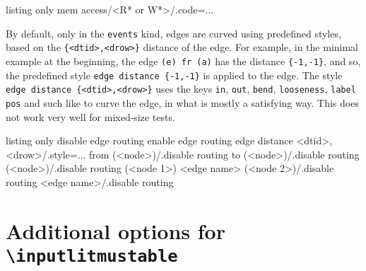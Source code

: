 \documentclass[a4paper]{article}
\begin{document}
\begin{tcblisting}{listing only}
mem access/<R* or W*>/.code={...} %
\end{tcblisting}

By default, only in the \lstinline|events| kind, edges are curved using predefined
styles, based on the \lstinline|{<dtid>,<drow>}| distance of the edge.
For example, in the minimal example at the beginning, the edge
\lstinline|(e) fr (a)| has the distance \lstinline|{-1,-1}|, and so, the predefined
style \lstinline|edge distance {-1,-1}| is applied to the edge.
The style \lstinline|edge distance {<dtid>,<drow>}| uses the keys \lstinline|in|,
\lstinline|out|, \lstinline|bend|, \lstinline|looseness|, \lstinline|label pos| and such like
to curve the edge, in what is mostly a satisfying way.
This does not work very well for mixed-size tests.

\begin{tcblisting}{listing only}
disable edge routing
enable edge routing
edge distance {<dtid>,<drow>}/.style={...}
from (<node>)/.disable routing                     %
to (<node>)/.disable routing                       %
(<node>)/.disable routing                          %
(<node 1>) <edge name> (<node 2>)/.disable routing %
<edge name>/.disable routing                       %
\end{tcblisting}



\section{Additional options for \texttt{\textbackslash inputlitmustable}}
\end{document}
